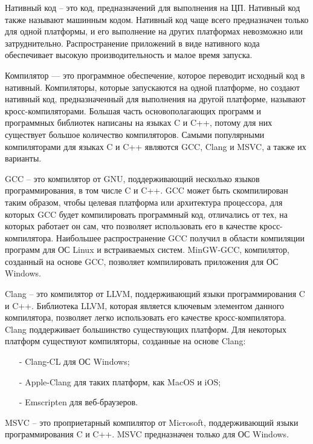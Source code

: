 Нативный код -- это код, предназначений для выполнения на ЦП.
Нативный код также называют машинным кодом.
Нативный код чаще всего предназначен только для одной платформы, и его выполнение на других платформах невозможно или затруднительно.
Распространение приложений в виде нативного кода обеспечивает высокую производительность и малое время запуска.

Компилятор — это программное обеспечение, которое переводит исходный код в нативный.
Компиляторы, которые запускаются на одной платформе, но создают нативный код, предназначенный для выполнения на другой платформе, называют кросс-компиляторами.
Большая часть основополагающих программ и программных библиотек написаны на языках C и C++, потому для них существует большое количество компиляторов.
Самыми популярными компиляторами для языках C и C++ являются GCC, Clang и MSVC, а также их варианты.

GCC -- это компилятор от GNU, поддерживающий несколько языков программирования, в том числе C и C++. 
GCC может быть скомпилирован таким образом, чтобы целевая платформа или архитектура процессора, для которых GCC будет компилировать программный код, отличались от тех, на которых работает он сам, что позволяет использовать его в качестве кросс-компилятора.
Наибольшее распространение GCC получил в области компиляции программ для ОС Linux и встраиваемых систем.
MinGW-GCC, компилятор, созданный на основе GCC, позволяет компилировать приложения для ОС Windows.

Clang -- это компилятор от LLVM, поддерживающий языки программирования C и C++.
Библиотека LLVM, которая является ключевым элементом данного компилятора, позволяет легко использовать его качестве кросс-компилятора. 
Clang поддерживает большинство существующих платформ. 
Для некоторых платформ существуют компиляторы, созданные на основе Clang:
\begin{itemize}
    \item[-] Clang-CL для ОС Windows;
    \item[-] Apple-Clang для таких платформ, как MacOS и iOS;
    \item[-] Emscripten для веб-браузеров.
\end{itemize}

MSVC -- это проприетарный компилятор от Microsoft, поддерживающий языки программирования C и C++. 
MSVC предназначен только для ОС Windows. 

